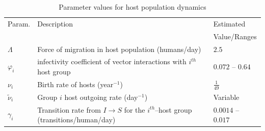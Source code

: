 \documentclass[a4paper]{article}
\newcommand{\miVar}{\varphi_i}
\begin{document}





\begin{table}[htbp]
	\captionsetup{skip=0pt}\caption{Parameter values for host population dynamics}\label{tab.tab2}
	\begin{tabular}{p{1.38cm}p{12cm}p{2.5cm}}
		\hline
		Param. & Description & Estimated \\
		&& Value/Ranges \\
		\hline
		$\Lambda$ & Force of migration in host population (humans/day) & $2.5$ \\
		$\miVar$ & infectivity coefficient of vector interactions with $i^{th}$ host group  
		& $0.072$ -- $0.64$ \\
		$\nu_i$ & Birth rate of hosts (year$^{-1}$) & $\frac{1}{49}$ \\
		$\widetilde \nu_i$ & Group $i$ host outgoing rate (day$^{-1}$) &  Variable \\
		
		$\gamma_i$ & Transition rate from $I \rightarrow S$ for  
		the $i^{th}$--host group (transitions/human/day) &$0.0014$ -- $0.017$\\
		
		\hline
	\end{tabular}
\end{table}
\end{document}
